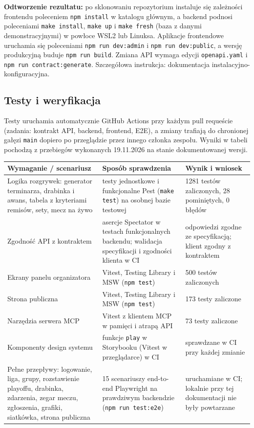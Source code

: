\documentclass[11pt,a4paper,oneside]{article}
\newif\ifpodpowiedzi
\newcommand{\podpowiedz}[1]{\ifpodpowiedzi\par\begingroup\small\color{hintcolor}\textit{Wskazówka: #1}\par\endgroup\fi}
\begin{document}
\textbf{Odtworzenie rezultatu:}
po sklonowaniu repozytorium instaluje się zależności frontendu poleceniem \texttt{npm install} w katalogu głównym, a backend podnosi poleceniami \texttt{make install}, \texttt{make up} i \texttt{make fresh} (baza z danymi demonstracyjnymi) w powłoce WSL2 lub Linuksa. Aplikacje frontendowe uruchamia się poleceniami \texttt{npm run dev:admin} i \texttt{npm run dev:public}, a wersję produkcyjną buduje \texttt{npm run build}. Zmiana API wymaga edycji \texttt{openapi.yaml} i \texttt{npm run contract:generate}. Szczegółowa instrukcja: dokumentacja instalacyjno-konfiguracyjna.

\subsection{Testy i weryfikacja}
\podpowiedz{Powiąż sprawdzenia z wymaganiami. Opisz warunki, dane lub scenariusze, oczekiwane rezultaty, uzyskane wyniki i wnioski. Dobierz metody do charakteru projektu: testy oprogramowania, sprawdzenia prototypu, kontrola jakości animacji lub ocena mechanizmu AI. Wskaż ograniczenia przeprowadzonych sprawdzeń.}
Testy uruchamia automatycznie GitHub Actions przy każdym pull requeście (zadania: kontrakt API, backend, frontend, E2E), a zmiany trafiają do chronionej gałęzi \texttt{main} dopiero po przeglądzie przez innego członka zespołu. Wyniki w tabeli pochodzą z przebiegów wykonanych 19.11.2026 na stanie dokumentowanej wersji.

\begin{tabularx}{\textwidth}{@{}Y Y Y@{}}
\toprule
Wymaganie / scenariusz & Sposób sprawdzenia & Wynik i wniosek\\
\midrule
Logika rozgrywek: generator terminarza, drabinka i awans, tabela z kryteriami remisów, sety, mecz na żywo & testy jednostkowe i funkcjonalne Pest (\texttt{make test}) na osobnej bazie testowej & 1281 testów zaliczonych, 28 pominiętych, 0 błędów\\
Zgodność API z kontraktem & asercje Spectator w testach funkcjonalnych backendu; walidacja specyfikacji i zgodności klienta w CI & odpowiedzi zgodne ze specyfikacją; klient zgodny z kontraktem\\
Ekrany panelu organizatora & Vitest, Testing Library i MSW (\texttt{npm test}) & 500 testów zaliczonych\\
Strona publiczna & Vitest, Testing Library i MSW (\texttt{npm test}) & 173 testy zaliczone\\
Narzędzia serwera MCP & Vitest z klientem MCP w pamięci i atrapą API & 73 testy zaliczone\\
Komponenty design systemu & funkcje \texttt{play} w Storybooku (Vitest w przeglądarce) w CI & sprawdzane w CI przy każdej zmianie\\
Pełne przepływy: logowanie, liga, grupy, rozstawienie playoffu, drabinka, zdarzenia, zegar meczu, zgłoszenia, grafiki, siatkówka, strona publiczna & 15 scenariuszy end-to-end Playwright na prawdziwym backendzie (\texttt{npm run test:e2e}) & uruchamiane w CI; lokalnie przy tej dokumentacji nie były powtarzane\\
\bottomrule
\end{tabularx}
\end{document}
